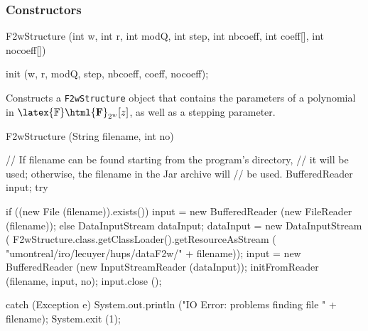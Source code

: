\subsubsection* {Constructors}
\begin{code}


   F2wStructure (int w, int r, int modQ, int step, int nbcoeff,
                 int coeff[], int nocoeff[]) \begin{hide}
   {
      init (w, r, modQ, step, nbcoeff, coeff, nocoeff);
   }
\end{hide}
\end{code}
\begin{tabb}
  Constructs a \texttt{F2wStructure} object that contains  the parameters of a
  polynomial in $\latex{\mathbb{F}}\html{\mathbf{F}}_{2^w}[z]$,
 as well as a stepping parameter.
\end{tabb}
\begin{code}

   F2wStructure (String filename, int no)\begin{hide}
   {
     // If filename can be found starting from the program's directory,
     // it will be used; otherwise, the filename in the Jar archive will
     // be used.
     BufferedReader input;
     try {
       if ((new File (filename)).exists()) {
          input = new BufferedReader (new FileReader (filename));
       } else {
          DataInputStream dataInput;
          dataInput = new DataInputStream (
             F2wStructure.class.getClassLoader().getResourceAsStream (
                 "umontreal/iro/lecuyer/hups/dataF2w/" + filename));
          input = new BufferedReader (new InputStreamReader (dataInput));
       }
       initFromReader (filename, input, no);
       input.close ();

     } catch (Exception e) {
       System.out.println ("IO Error: problems finding file " + filename);
       System.exit (1);
     }
   }\end{hide}
\end{code}
